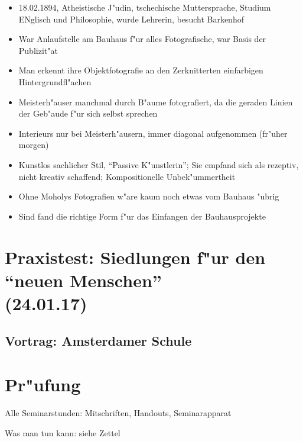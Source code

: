 \documentclass[emulatestandardclasses]{scrartcl}
\begin{document}
\begin{itemize}
  \item 18.02.1894, Atheistische J"udin, tschechische Muttersprache, Studium ENglisch und Philosophie, wurde Lehrerin, besucht Barkenhof
  \item War Anlaufstelle am Bauhaus f"ur alles Fotografische, war Basis der Publizit"at
  \item Man erkennt ihre Objektfotografie an den Zerknitterten einfarbigen Hintergrundfl"achen
  \item Meisterh"auser manchmal durch B"aume fotografiert, da die geraden Linien der Geb"aude f"ur sich selbst sprechen
  \item Interieurs nur bei Meisterh"ausern, immer diagonal aufgenommen (fr"uher morgen)
  \item Kunstlos sachlicher Stil, "`Passive K"unstlerin"'; Sie empfand sich als rezeptiv, nicht kreativ schaffend; Kompositionelle Unbek"ummertheit
  \item Ohne Moholys Fotografien w"are kaum noch etwas vom Bauhaus "ubrig
  \item Sind fand die richtige Form f"ur das Einfangen der Bauhausprojekte
\end{itemize}



\section{Praxistest: Siedlungen f"ur den "`neuen Menschen"'\\(24.01.17)}



\subsection{Vortrag: Amsterdamer Schule}


\section{Pr"ufung}

Alle Seminarstunden: Mitschriften, Handouts, Seminarapparat

Was man tun kann: siehe Zettel


%
\end{document}
